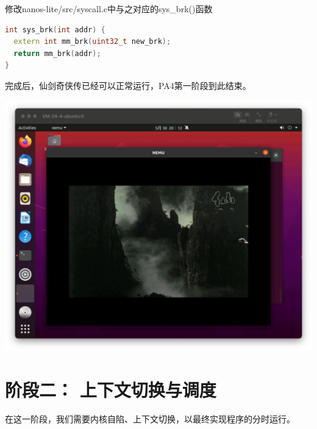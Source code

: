 \documentclass[UTF8,a4paper,10pt]{ctexart}
\begin{document}
修改nanos-lite/src/syscall.c中与之对应的sys\_brk()函数
\begin{lstlisting}[language = C++]
int sys_brk(int addr) {
  extern int mm_brk(uint32_t new_brk);
  return mm_brk(addr);
}
\end{lstlisting}
完成后，仙剑奇侠传已经可以正常运行，PA4第一阶段到此结束。
\begin{center}
  \includegraphics*[scale = 0.4]{img/8}
\end{center}

\section{阶段二： 上下文切换与调度}
在这一阶段，我们需要内核自陷、上下文切换，以最终实现程序的分时运行。
\end{document}
